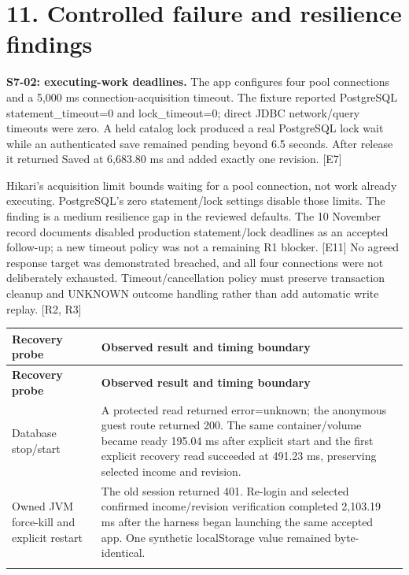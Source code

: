 \documentclass[11pt,a4paper]{article}
\begin{document}
\section*{11. Controlled failure and resilience findings}

\textbf{S7-02: executing-work deadlines.} The app configures four pool connections and a 5,000 ms connection-acquisition timeout. The fixture reported PostgreSQL statement\_timeout=0 and lock\_timeout=0; direct JDBC network/\allowbreak{}query timeouts were zero. A held catalog lock produced a real PostgreSQL lock wait while an authenticated save remained pending beyond 6.5 seconds. After release it returned Saved at 6,683.80 ms and added exactly one revision. [E7]

Hikari's acquisition limit bounds waiting for a pool connection, not work already executing. PostgreSQL's zero statement/\allowbreak{}lock settings disable those limits. The finding is a medium resilience gap in the reviewed defaults. The 10 November record documents disabled production statement/\allowbreak{}lock deadlines as an accepted follow-up; a new timeout policy was not a remaining R1 blocker. [E11] No agreed response target was demonstrated breached, and all four connections were not deliberately exhausted. Timeout/\allowbreak{}cancellation policy must preserve transaction cleanup and UNKNOWN outcome handling rather than add automatic write replay. [R2, R3]

{\fontsize{9.5}{11.5}\selectfont
\begin{longtable}{@{}>{\raggedright\arraybackslash}p{}>{\raggedright\arraybackslash}p{}@{}}\toprule
\textbf{Recovery probe} & \textbf{Observed result and timing boundary} \\ \midrule\endfirsthead
\toprule\textbf{Recovery probe} & \textbf{Observed result and timing boundary} \\ \midrule\endhead
\bottomrule\endfoot
Database stop/\allowbreak{}start & A protected read returned error=unknown; the anonymous guest route returned 200. The same container/\allowbreak{}volume became ready 195.04 ms after explicit start and the first explicit recovery read succeeded at 491.23 ms, preserving selected income and revision. \\ \addlinespace[3pt]
Owned JVM force-kill and explicit restart & The old session returned 401. Re-login and selected confirmed income/\allowbreak{}revision verification completed 2,103.19 ms after the harness began launching the same accepted app. One synthetic localStorage value remained byte-identical. \\ \addlinespace[3pt]
\end{longtable}}
\end{document}
